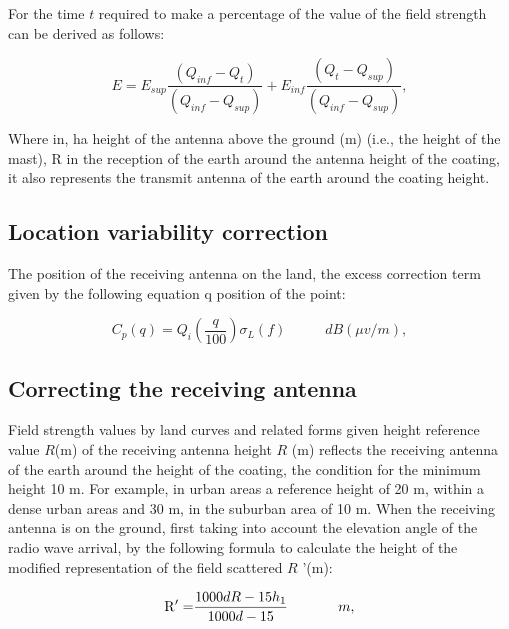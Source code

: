 \documentclass[12pt,a4paper,twocolumn,fleqn]{narms}
\begin{document}
{For the time $t$ required to make a percentage of the value of the field strength can be derived as follows:

\begin{equation}
E = {E_{sup}}\frac{{({Q_{inf}} - {Q_t})}}{{({Q_{inf}} - {Q_{sup}})}} + {E_{inf}}\frac{{({Q_t} - {Q_{sup}})}}{{({Q_{inf}} - {Q_{sup}})}}, \label{keurough} \end{equation}

Where in, ha height of the antenna above the ground (m) (i.e., the height of the mast), R in the reception of the earth around the antenna height of the coating, it also represents the transmit antenna of the earth around the coating height.


\subsection{Location variability correction}

The position of the receiving antenna on the land, the excess correction term given by the following equation q position of the point:

\begin{equation}
{C_p}(q) = {Q_i}(\frac{q}{{100}}){\sigma _L}(f)\;\;\;\;\;\;\;\;\;\;dB(\mu v/m), \label{keurough} \end{equation}


\subsection{Correcting the receiving antenna}

Field strength values by land curves and related forms given height reference value $R$(m) of the receiving antenna height $R$ (m) reflects the receiving antenna of the earth around the height of the coating, the condition for the minimum height 10 m. For example, in urban areas a reference height of 20 m, within a dense urban areas and 30 m, in the suburban area of 10 m. 
When the receiving antenna is on the ground, first taking into account the elevation angle of the radio wave arrival, by the following formula to calculate the height of the modified representation of the field scattered $R$ '(m):

\begin{equation}
{\rm{R' = }}\frac{{1000dR - 15{h_1}}}{{1000d - 15}}{\kern 1pt} {\kern 1pt} {\kern 1pt} {\kern 1pt} {\kern 1pt} {\kern 1pt} {\kern 1pt} {\kern 1pt} {\kern 1pt} {\kern 1pt} {\kern 1pt} {\kern 1pt} {\kern 1pt} {\kern 1pt} {\kern 1pt} {\kern 1pt} {\kern 1pt} {\kern 1pt} {\kern 1pt} {\kern 1pt} {\kern 1pt} {\kern 1pt} {\kern 1pt} {\kern 1pt} {\kern 1pt} {\kern 1pt} {\kern 1pt} {\kern 1pt} {\kern 1pt} {\kern 1pt} {\kern 1pt} {\kern 1pt} {\kern 1pt} {\kern 1pt} {\kern 1pt} {\kern 1pt} m, \label{keurough} \end{equation}

}
\end{document}
